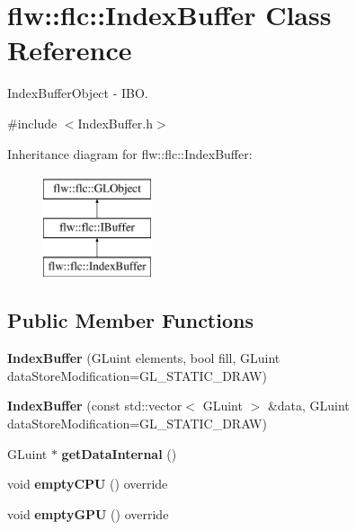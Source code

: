 \hypertarget{classflw_1_1flc_1_1IndexBuffer}{}\section{flw\+:\+:flc\+:\+:Index\+Buffer Class Reference}
\label{classflw_1_1flc_1_1IndexBuffer}


Index\+Buffer\+Object -\/ I\+BO.  




{\ttfamily \#include $<$Index\+Buffer.\+h$>$}

Inheritance diagram for flw\+:\+:flc\+:\+:Index\+Buffer\+:\begin{figure}[H]
\begin{center}
\leavevmode
\includegraphics[height=3.000000cm]{classflw_1_1flc_1_1IndexBuffer}
\end{center}
\end{figure}
\subsection*{Public Member Functions}
\begin{DoxyCompactItemize}
\item 
{\bfseries Index\+Buffer} (G\+Luint elements, bool fill, G\+Luint data\+Store\+Modification=G\+L\+\_\+\+S\+T\+A\+T\+I\+C\+\_\+\+D\+R\+AW)\hypertarget{classflw_1_1flc_1_1IndexBuffer_a47991f0d3db10cfd1f946635e1a45aad}{}\label{classflw_1_1flc_1_1IndexBuffer_a47991f0d3db10cfd1f946635e1a45aad}

\item 
{\bfseries Index\+Buffer} (const std\+::vector$<$ G\+Luint $>$ \&data, G\+Luint data\+Store\+Modification=G\+L\+\_\+\+S\+T\+A\+T\+I\+C\+\_\+\+D\+R\+AW)\hypertarget{classflw_1_1flc_1_1IndexBuffer_a7bc7c0154f66f622e702830a1c005092}{}\label{classflw_1_1flc_1_1IndexBuffer_a7bc7c0154f66f622e702830a1c005092}

\item 
G\+Luint $\ast$ {\bfseries get\+Data\+Internal} ()\hypertarget{classflw_1_1flc_1_1IndexBuffer_a9f5a8ec45b5f93f76eba01922cd76c90}{}\label{classflw_1_1flc_1_1IndexBuffer_a9f5a8ec45b5f93f76eba01922cd76c90}

\item 
void {\bfseries empty\+C\+PU} () override\hypertarget{classflw_1_1flc_1_1IndexBuffer_a7dfedbdadc1a813955a25f1000f6c8c3}{}\label{classflw_1_1flc_1_1IndexBuffer_a7dfedbdadc1a813955a25f1000f6c8c3}

\item 
void {\bfseries empty\+G\+PU} () override\hypertarget{classflw_1_1flc_1_1IndexBuffer_a88230425f7e4391a216acf45ffb2e1d0}{}\label{classflw_1_1flc_1_1IndexBuffer_a88230425f7e4391a216acf45ffb2e1d0}

\end{DoxyCompactItemize}
